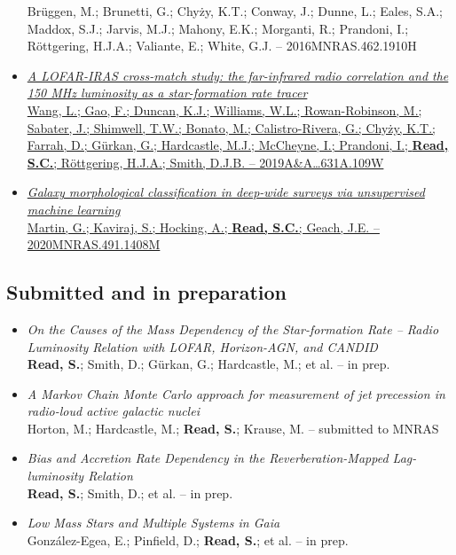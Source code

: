 \documentclass[letterpaper]{twentysecondcv} %
\begin{document}
\begin{finalpages}
\begin{itemize}
{{Brüggen, M.; Brunetti, G.; Chyży, K.T.; Conway, J.; Dunne, L.; Eales,
S.A.; Maddox, S.J.; Jarvis, M.J.; Mahony, E.K.; Morganti, R.; Prandoni,
I.; Röttgering, H.J.A.; Valiante, E.; White, G.J. -- 2016MNRAS.462.1910H}}
 \item \href{http://shaun.science/publication/2019-11-00-A-LOFAR-IRAS-cross-match-study}{\textit{A LOFAR-IRAS cross-match study: the far-infrared radio correlation and
the 150 MHz luminosity as a star-formation rate tracer}\\{\small Wang, L.; Gao, F.; Duncan, K.J.; Williams, W.L.; Rowan-Robinson, M.;
Sabater, J.; Shimwell, T.W.; Bonato, M.; Calistro-Rivera, G.; Chyży,
K.T.; Farrah, D.; Gürkan, G.; Hardcastle, M.J.; McCheyne, I.; Prandoni,
I.; \textbf{Read, S.C.}; Röttgering, H.J.A.; Smith, D.J.B. -- 2019A\&A\ldots631A.109W}}
 \item \href{http://shaun.science/publication/2020-01-00-Galaxy-morphological-classification-in-deep-wide-surveys-via-unsupervised-machine-learning}{\textit{Galaxy morphological classification in deep-wide surveys via
unsupervised machine learning}\\{\small Martin, G.; Kaviraj, S.; Hocking, A.; \textbf{Read, S.C.}; Geach, J.E. -- 2020MNRAS.491.1408M}}
\end{itemize}

\subsection{Submitted and in preparation}
\begin{itemize}
     \item \textit{On the Causes of the Mass Dependency of the Star-formation Rate -- Radio
Luminosity Relation with LOFAR, Horizon-AGN, and CANDID}\\{\small \textbf{Read, S.}; Smith, D.; Gürkan, G.; Hardcastle, M.; et al. -- in prep.}
 \item \textit{A Markov Chain Monte Carlo approach for measurement of jet precession in
radio-loud active galactic nuclei}\\{\small Horton, M.; Hardcastle, M.; \textbf{Read, S.}; Krause, M. -- submitted to MNRAS}
 \item \textit{Bias and Accretion Rate Dependency in the Reverberation-Mapped
Lag-luminosity Relation}\\{\small \textbf{Read, S.}; Smith, D.; et al. -- in prep.}
 \item \textit{Low Mass Stars and Multiple Systems in Gaia}\\{\small González-Egea, E.; Pinfield, D.; \textbf{Read, S.}; et al. -- in prep.}
\end{itemize}
\end{finalpages}
\end{document}
